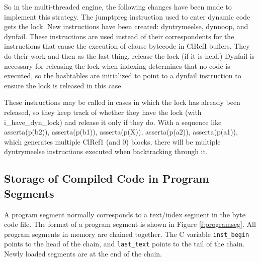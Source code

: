 \documentclass[11pt]{article}
\begin{document}
So in the multi-threaded engine, the following changes have been made
to implement this strategy.  The jumptpreg instruction used to enter
dynamic code gets the lock.  New instructions have been created:
dyntrymeelse, dynnoop, and dynfail.  These instructions are used
instead of their correspondents for the instructions that cause the
execution of clause bytecode in ClRefI buffers.  They do their work
and then as the last thing, release the lock (if it is held.)  Dynfail
is necessary for releasing the lock when indexing determines that no
code is executed, so the hashtables are initialized to point to a
dynfail instruction to ensure the lock is released in this case.

These instructions may be called in cases in which the lock has
already been released, so they keep track of whether they have the
lock (with i\_have\_dyn\_lock) and release it only if they do.  With a
sequence like asserta(p(b2)), asserta(p(b1)), asserta(p(X)),
asserta(p(a2)), asserta(p(a1)), which generates multiple ClRef1 (and
0) blocks, there will be multiple dyntrymeelse instructions executed
when backtracking through it.

\subsection{Storage of Compiled Code in Program Segments}

A program segment normally corresponds to a text/index segment in the 
byte code file.
The format of a program segment is shown in Figure \ref{f:programseg}.
All program segments in memory are chained together. The C variable
{\tt inst\_begin} points to the head of the chain, and 
{\tt last\_text} points to the tail of the chain. Newly loaded
segments are at the end of the chain.
\end{document}
